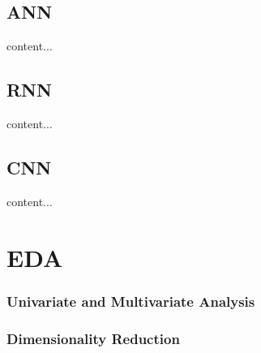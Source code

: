 \documentclass{beamer}
\begin{document}
\begin{frame}[plain]
\hspace*{-3pt}
\end{frame}

\subsection{ANN}
\begin{frame}
	content...
\end{frame}


\subsection{RNN}
\begin{frame}
content...
\end{frame}

\subsection{CNN}
\begin{frame}
content...
\end{frame}

\section{EDA}
\begin{frame}\frametitle{Univariate and Multivariate Analysis}
\end{frame}

\begin{frame}\frametitle{Dimensionality Reduction}
\end{frame}
\end{document}
